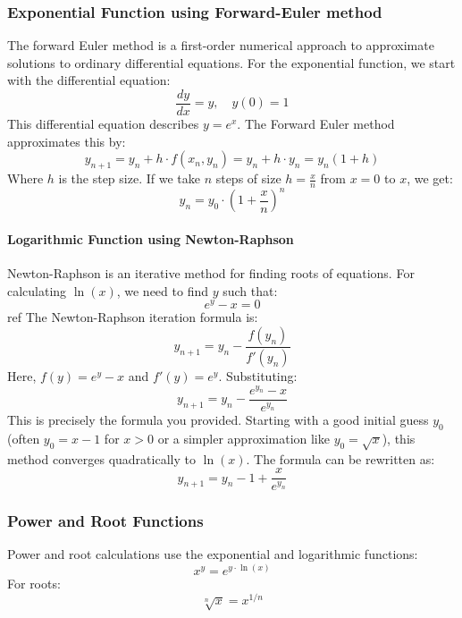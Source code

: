 \documentclass[12pt]{article}
\begin{document}
\subsubsection{Exponential Function using Forward-Euler method}
The forward Euler method is a first-order numerical approach to approximate solutions to ordinary differential equations. For the exponential function, we start with the differential equation:
\begin{equation}
\frac{dy}{dx} = y, \quad y(0) = 1
\end{equation}
This differential equation describes $y = e^x$. The Forward Euler method approximates this by:
\begin{equation}
y_{n+1} = y_n + h \cdot f(x_n, y_n) = y_n + h \cdot y_n = y_n(1 + h)
\end{equation}
Where $h$ is the step size. If we take $n$ steps of size $h = \frac{x}{n}$ from $x=0$ to $x$, we get:
\begin{equation}
y_n = y_0 \cdot \left(1 + \frac{x}{n}\right)^n
\end{equation}

\paragraph{Logarithmic Function using Newton-Raphson}
Newton-Raphson is an iterative method for finding roots of equations. For calculating $\ln(x)$, we need to find $y$ such that:
\begin{equation}
e^y - x = 0
\end{equation}ref
The Newton-Raphson iteration formula is:
\begin{equation}
y_{n+1} = y_n - \frac{f(y_n)}{f'(y_n)}
\end{equation}
Here, $f(y) = e^y - x$ and $f'(y) = e^y$. Substituting:
\begin{equation}
y_{n+1} = y_n - \frac{e^{y_n} - x}{e^{y_n}}
\end{equation}
This is precisely the formula you provided. Starting with a good initial guess $y_0$ (often $y_0 = x-1$ for $x > 0$ or a simpler approximation like $y_0 = \sqrt{x}$), this method converges quadratically to $\ln(x)$.
The formula can be rewritten as:
\begin{equation}
y_{n+1} = y_n - 1 + \frac{x}{e^{y_n}}
\end{equation}
\subsubsection{Power and Root Functions}
Power and root calculations use the exponential and logarithmic functions:
\begin{equation}
x^y = e^{y \cdot \ln(x)}
\end{equation}
For roots:
\begin{equation}
\sqrt[n]{x} = x^{1/n}
\end{equation}
\end{document}
